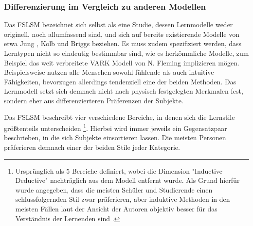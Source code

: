 \subsubsection{Differenzierung im Vergleich zu anderen Modellen}
Das FSLSM bezeichnet sich selbst als eine Studie, dessen Lernmodelle weder originell, noch allumfassend sind, und sich auf bereits existierende Modelle von etwa Jung \cite{jung}, Kolb \cite{kolb} und Briggs \cite{myers} beziehen.
Es muss zudem spezifiziert werden, dass Lerntypen nicht so eindeutig bestimmbar sind, wie es herkömmliche Modelle, zum Beispiel das weit verbreitete VARK Modell von N. Fleming implizieren mögen.
Beispielsweise nutzen alle Menschen sowohl fühlende als auch intuitive Fähigkeiten, bevorzugen allerdings tendenziell eine der beiden Methoden. Das Lernmodell setzt sich demnach nicht nach physisch festgelegten Merkmalen fest, sondern eher aus differenzierteren Präferenzen der Subjekte.

Das FSLSM beschreibt vier verschiedene Bereiche, in denen sich die Lernstile größtenteils unterscheiden \footnote{Ursprünglich als 5 Bereiche definiert, wobei die Dimension "Inductive Deductive" nachträglich aus dem Modell entfernt wurde. Als Grund hierfür wurde angegeben, dass die meisten Schüler und Studierende einen schlussfolgernden Stil zwar präferieren, aber induktive Methoden in den meisten Fällen laut der Ansicht der Autoren objektiv besser für das Verständnis der Lernenden sind \cite{felder}.}. Hierbei wird immer jeweils ein Gegensatzpaar beschrieben, in die sich Subjekte einsortieren lassen. Die meisten Personen präferieren demnach einer der beiden Stile jeder Kategorie.

